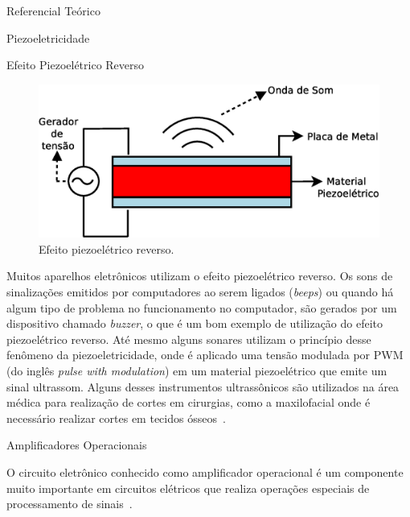 \begin{chapter}{Referencial Teórico}
\begin{section}{Piezoeletricidade}
\begin{subsection}{Efeito Piezoelétrico Reverso}
\begin{figure}[!h]
	\centering
	\begin{minipage}[c]{\textwidth}
	\centering
	\includegraphics[width=0.8\linewidth]{fig/EfeitoPiezoEletricoReverso}
	\caption{Efeito piezoelétrico reverso.}
	\label{fig:reverso}
	\end{minipage}
\end{figure}

Muitos aparelhos eletrônicos utilizam o efeito piezoelétrico reverso. Os sons de
sinalizações emitidos por computadores ao serem ligados (\textit{beeps}) ou
quando há algum tipo de problema no funcionamento no computador, são gerados por
um dispositivo chamado \textit{buzzer}, o que é um bom exemplo de utilização do
efeito piezoelétrico reverso.  Até mesmo alguns sonares utilizam o princípio
desse fenômeno da piezoeletricidade, onde é aplicado uma tensão modulada por PWM
(do inglês \textit{pulse with modulation}) em um material piezoelétrico que
emite um sinal ultrassom. Alguns desses instrumentos ultrassônicos são
utilizados na área médica para realização de cortes em cirurgias, como a
maxilofacial onde é necessário realizar cortes em tecidos
ósseos~\cite{Carvalho17}. 
 
\end{subsection}

\end{section}

\begin{section}{Amplificadores Operacionais} 

O circuito eletrônico conhecido como amplificador operacional é um componente
muito importante em circuitos elétricos que realiza operações especiais de
processamento de sinais~\cite{Richard2000}. 


\end{section}
\end{chapter}
